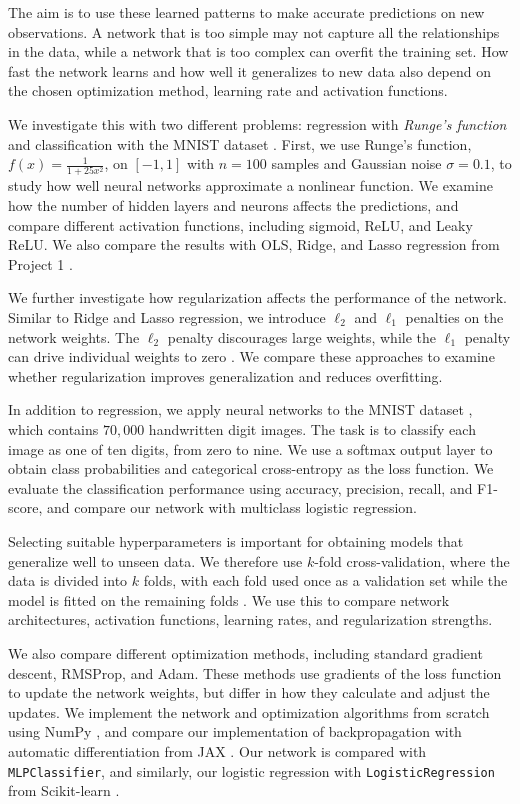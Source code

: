 \documentclass[amssymb,secnumarabic,twocolumn,aps]{revtex4}
\begin{document}
The aim is to use these learned patterns to make accurate predictions on new observations. A network that is too simple may not capture all the relationships in the data, while a network that is too complex can overfit the training set. How fast the network learns and how well it generalizes to new data also depend on the chosen optimization method, learning rate and activation functions.

We investigate this with two different problems: regression with \emph{Runge's function} and classification with the MNIST dataset \cite{lecun2010mnist}. First, we use Runge's function, $f(x) = \frac{1}{1+25x^2}$, on $[-1,1]$ with $n=100$ samples and Gaussian noise $\sigma=0.1$, to study how well neural networks approximate a nonlinear function. We examine how the number of hidden layers and neurons affects the predictions, and compare different activation functions, including sigmoid, ReLU, and Leaky ReLU. We also compare the results with OLS, Ridge, and Lasso regression from Project 1 \cite{project1}.

We further investigate how regularization affects the performance of the network. Similar to Ridge and Lasso regression, we introduce $\ell_2$ and $\ell_1$ penalties on the network weights. The $\ell_2$ penalty discourages large weights, while the $\ell_1$ penalty can drive individual weights to zero \cite{lecturebook}. We compare these approaches to examine whether regularization improves generalization and reduces overfitting.

In addition to regression, we apply neural networks to the MNIST dataset \cite{lecun2010mnist}, which contains $70,000$ handwritten digit images. The task is to classify each image as one of ten digits, from zero to nine. We use a softmax output layer to obtain class probabilities and categorical cross-entropy as the loss function. We evaluate the classification performance using accuracy, precision, recall, and F1-score, and compare our network with multiclass logistic regression.

Selecting suitable hyperparameters is important for obtaining models that generalize well to unseen data. We therefore use $k$-fold cross-validation, where the data is divided into $k$ folds, with each fold used once as a validation set while the model is fitted on the remaining folds \cite{hastie}. We use this to compare network architectures, activation functions, learning rates, and regularization strengths.

We also compare different optimization methods, including standard gradient descent, RMSProp, and Adam. These methods use gradients of the loss function to update the network weights, but differ in how they calculate and adjust the updates. We implement the network and optimization algorithms from scratch using NumPy \cite{numpy}, and compare our implementation of backpropagation with automatic differentiation from JAX \cite{jax}. Our network is compared with \texttt{MLPClassifier}, and similarly, our logistic regression with \texttt{LogisticRegression} from Scikit-learn \cite{scikit-learn}.
\end{document}
